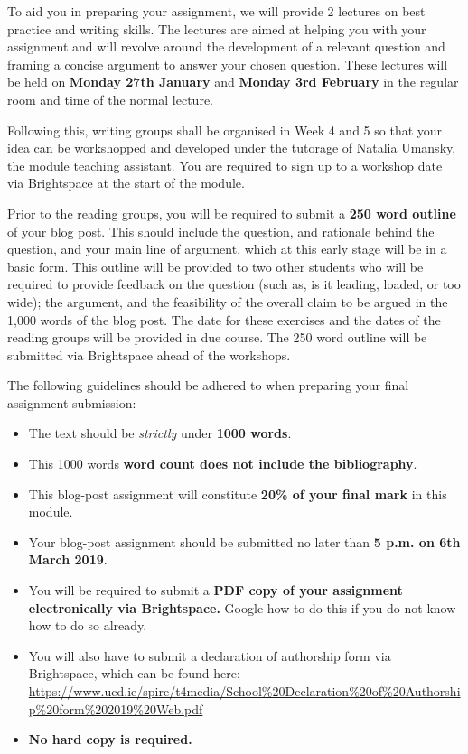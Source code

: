 	To aid you in preparing your assignment, we will provide 2 lectures on best practice and writing skills. The lectures are aimed at helping you with your assignment and will revolve around the development of a relevant question and framing a concise argument to answer your chosen question. These lectures will be held on \textbf{Monday 27th January} and \textbf{Monday 3rd February} in the regular room and time of the normal lecture. 

	Following this, writing groups shall be organised in Week 4 and 5 so that your idea can be workshopped and developed under the tutorage of Natalia Umansky, the module teaching assistant. You are required to sign up to a workshop date via Brightspace at the start of the module.
	
	Prior to the reading groups, you will be required to submit a \textbf{250 word outline} of your blog post. This should include the question, and rationale behind the question, and your main line of argument, which at this early stage will be in a basic form. This outline will be provided to two other students who will be required to provide feedback on the question (such as, is it leading, loaded, or too wide); the argument, and the feasibility of the overall claim to be argued in the 1,000 words of the blog post. The date for these exercises and the dates of the reading groups will be provided in due course. The 250 word outline will be submitted via Brightspace ahead of the workshops.

	The following guidelines should be adhered to when preparing your final assignment submission:
	
\begin{itemize}
	\item The text should be \textit{strictly} under \textbf{1000 words}.
	\item This 1000 words \textbf{word count does not include the bibliography}. 
	\item This blog-post assignment will constitute \textbf{20\% of your final mark} in this module.
	\item Your blog-post assignment should be submitted no later than \textbf{5 p.m. on 6th March 2019}.
	\item You will be required to submit a \textbf{PDF copy of your assignment electronically via Brightspace.} Google how to do this if you do not know how to do so already.
	\item You will also have to submit a declaration of authorship form via Brightspace, which can be found here: \url{https://www.ucd.ie/spire/t4media/School%20Declaration%20of%20Authorship%20form%202019%20Web.pdf}
	\item \textbf{No hard copy is required.}
\end{itemize}

